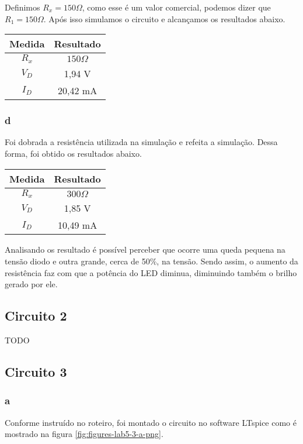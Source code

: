 \documentclass[a4paper]{report}
\begin{document}
Definimos $R_x = 150 \Omega$, como esse é um valor comercial, podemos dizer que $R_1 = 150 \Omega$. Após isso simulamos o circuito e alcançamos os resultados abaixo.

\begin{table}[H]
    \centering
    \begin{tabular}{c | c}
	Medida & Resultado \\
	\hline
	$R_{x}$ & $150 \Omega$ \\
	$V_{D}$ & 1,94 V \\
	$I_{D}$ & 20,42 mA
\end{tabular}
\end{table}

\subsubsection*{d}
Foi dobrada a resistência utilizada na simulação e refeita a simulação. Dessa forma, foi obtido os resultados abaixo.

\begin{table}[H]
    \centering
    \begin{tabular}{c | c}
	Medida & Resultado \\
	\hline
	$R_{x}$ & $300 \Omega$ \\
	$V_{D}$ & 1,85 V \\
	$I_{D}$ & 10,49 mA
\end{tabular}
\end{table}

Analisando os resultado é possível perceber que ocorre uma queda pequena na tensão diodo e outra grande, cerca de 50\%, na tensão. Sendo assim, o aumento da resistência faz com que a potência do LED diminua, diminuindo também o brilho gerado por ele.

\subsection*{Circuito 2}
TODO

\subsection*{Circuito 3}
\subsubsection*{a}
Conforme instruído no roteiro, foi montado o circuito no software LTspice como é mostrado na figura \ref{fig:figures-lab5-3-a-png}.
\end{document}
